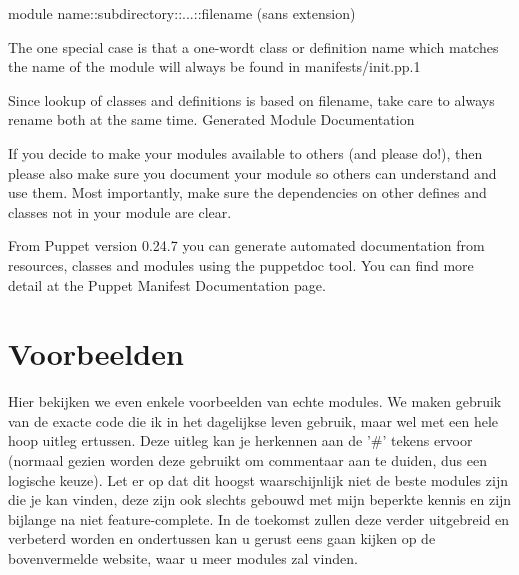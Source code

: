 {module name}::{subdirectory}::{...}::{filename (sans extension)}

The one special case is that a one-wordt class or definition name which matches the name of the module will always be found in manifests/init.pp.1

Since lookup of classes and definitions is based on filename, take care to always rename both at the same time.
Generated Module Documentation

If you decide to make your modules available to others (and please do!), then please also make sure you document your module so others can understand and use them. Most importantly, make sure the dependencies on other defines and classes not in your module are clear.

From Puppet version 0.24.7 you can generate automated documentation from resources, classes and modules using the puppetdoc tool. You can find more detail at the Puppet Manifest Documentation page.

\section{Voorbeelden}
Hier bekijken we even enkele voorbeelden van echte modules. We maken gebruik van de exacte code die ik in het dagelijkse leven gebruik, maar wel met een hele hoop uitleg ertussen. Deze uitleg kan je herkennen aan de '\#' tekens ervoor (normaal gezien worden deze gebruikt om commentaar aan te duiden, dus een logische keuze). Let er op dat dit hoogst waarschijnlijk niet de beste modules zijn die je kan vinden, deze zijn ook slechts gebouwd met mijn beperkte kennis en zijn bijlange na niet feature-complete. In de toekomst zullen deze verder uitgebreid en verbeterd worden en ondertussen kan u gerust eens gaan kijken op de bovenvermelde website, waar u meer modules zal vinden.



